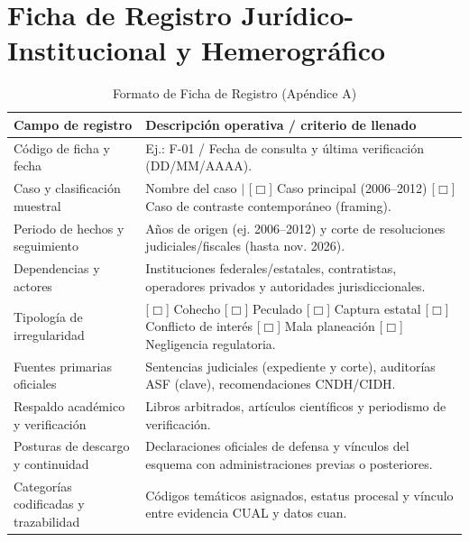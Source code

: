 

\section{Ficha de Registro Jurídico-Institucional y Hemerográfico}

\begin{table}[H]
\centering
\caption{Formato de Ficha de Registro (Apéndice A)}
\label{tab:ficha_registro}
\small
\begin{tabular}{@{}p{4cm}p{10cm}@{}}
\toprule
\textbf{Campo de registro} & \textbf{Descripción operativa / criterio de llenado} \\
\midrule
Código de ficha y fecha & Ej.: F-01 / Fecha de consulta y última verificación (DD/MM/AAAA). \\
\addlinespace
Caso y clasificación muestral & Nombre del caso $|$ [$\Box$] Caso principal (2006--2012) [$\Box$] Caso de contraste contemporáneo (framing). \\
\addlinespace
Periodo de hechos y seguimiento & Años de origen (ej. 2006--2012) y corte de resoluciones judiciales/fiscales (hasta nov. 2026). \\
\addlinespace
Dependencias y actores & Instituciones federales/estatales, contratistas, operadores privados y autoridades jurisdiccionales. \\
\addlinespace
Tipología de irregularidad & [$\Box$] Cohecho [$\Box$] Peculado [$\Box$] Captura estatal [$\Box$] Conflicto de interés [$\Box$] Mala planeación [$\Box$] Negligencia regulatoria. \\
\addlinespace
Fuentes primarias oficiales & Sentencias judiciales (expediente y corte), auditorías ASF (clave), recomendaciones CNDH/CIDH. \\
\addlinespace
Respaldo académico y verificación & Libros arbitrados, artículos científicos y periodismo de verificación. \\
\addlinespace
Posturas de descargo y continuidad & Declaraciones oficiales de defensa y vínculos del esquema con administraciones previas o posteriores. \\
\addlinespace
Categorías codificadas y trazabilidad & Códigos temáticos asignados, estatus procesal y vínculo entre evidencia CUAL y datos cuan. \\
\bottomrule
\end{tabular}
\end{table}

